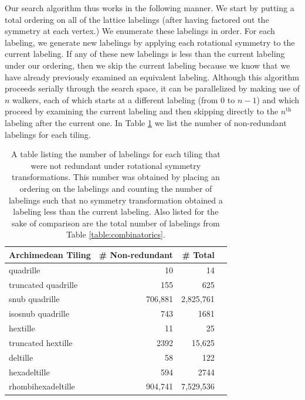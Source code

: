 \documentclass{amsbook}
\theoremstyle{plain}
\theoremstyle{definition}
\theoremstyle{remark}
\begin{document}
Our search algorithm thus works in the following manner.  We start by putting a total ordering on all of the lattice labelings (after having factored out the symmetry at each vertex.)  We enumerate these labelings in order.  For each labeling, we generate new labelings by applying each rotational symmetry to the current labeling.  If any of these new labelings is less than the current labeling under our ordering, then we skip the current labeling because we know that we have already previously examined an equivalent labeling.  Although this algorithm proceeds serially through the search space, it can be parallelized by making use of $n$ walkers, each of which starts at a different labeling (from $0$ to $n-1$) and which proceed by examining the current labeling and then skipping directly to the $n^{\text{th}}$ labeling after the current one.  In Table \ref{table:count-of-labels-scanned} we list the number of non-redundant labelings for each tiling.

\begin{table}
\begin{tabular}{lrrr} \toprule
Archimedean Tiling & \# Non-redundant & \# Total \\ \midrule
quadrille & 10 & 14\\
truncated quadrille & 155 & 625\\
snub quadrille & 706,881 & 2,825,761\\
isosnub quadrille & 743 & 1681\\
hextille & 11 & 25\\
truncated hextille & 2392 & 15,625\\
deltille & 58 & 122\\
hexadeltille & 594 & 2744\\
rhombihexadeltille & 904,741 & 7,529,536\\ \bottomrule
\end{tabular}
\caption[Number of non-redundant labelings in each tiling]{
\label{table:count-of-labels-scanned}
A table listing the number of labelings for each tiling that were not redundant under rotational symmetry transformations.  This number was obtained by placing an ordering on the labelings and counting the number of labelings such that no symmetry transformation obtained a labeling less than the current labeling.  Also listed for the sake of comparison are the total number of labelings from Table \ref{table:combinatorics}.}
\end{table}
\end{document}
